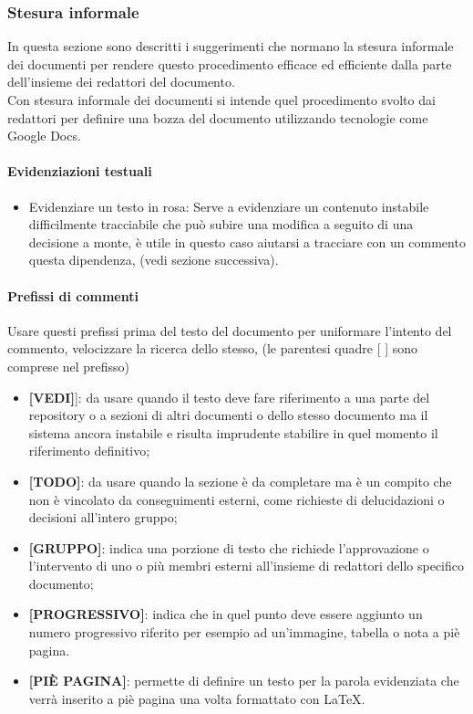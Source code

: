 		\subsubsection{Stesura informale}
			In questa sezione sono descritti i suggerimenti che normano la stesura informale dei documenti per rendere questo procedimento efficace ed efficiente dalla parte dell’insieme dei redattori del documento.\\
			Con stesura informale dei documenti si intende quel procedimento svolto dai redattori per definire una bozza del documento utilizzando tecnologie come Google Docs.
			\paragraph{Evidenziazioni testuali}
				\begin{itemize}
					\item\colorbox{bubblegum}{Evidenziare un testo in rosa}: Serve a evidenziare un contenuto instabile difficilmente tracciabile che può subire una modifica a seguito di una decisione a monte, è utile in questo caso aiutarsi a tracciare con un commento questa dipendenza, (vedi sezione successiva).\\
				\end{itemize}
			\paragraph{Prefissi di commenti}
				Usare questi prefissi prima del testo del documento per uniformare l’intento del commento, velocizzare la ricerca dello stesso, (le parentesi quadre {[ ]} sono comprese nel prefisso)\\
				\begin{itemize}
					\item\textbf{[VEDI]}]: da usare quando il testo deve fare riferimento a una parte del repository o a sezioni di altri documenti o dello stesso documento ma il sistema ancora instabile e risulta imprudente stabilire in quel momento il riferimento definitivo; \\
					\item\textbf{[TODO]}: da usare quando la sezione è da completare ma è un compito che non è vincolato da conseguimenti esterni, come richieste di delucidazioni o decisioni all’intero gruppo; \\
					\item\textbf{[GRUPPO]}: indica una porzione di testo che richiede l’approvazione o l’intervento di uno o più membri esterni all’insieme di redattori dello specifico documento;
					\item\textbf{[PROGRESSIVO]}: indica che in quel punto deve essere aggiunto un numero progressivo riferito per esempio ad un’immagine, tabella o nota a piè pagina. \\
					\item\textbf{[PIÈ PAGINA]}: permette di definire un testo per la parola evidenziata che verrà inserito a piè pagina una volta formattato con LaTeX.
				\end{itemize}

